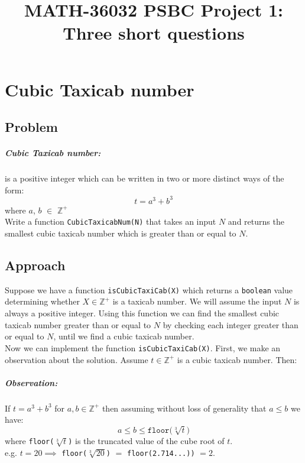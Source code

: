 \documentclass[11pt]{report}
\title{MATH-36032 PSBC Project 1: Three short questions}
\begin{document}
\chapter{Cubic Taxicab number}

\section*{Problem}
\paragraph{Cubic Taxicab number:}
is a positive integer which can be written in two or more distinct ways of the form:
\begin{equation*}
	t = a^3 + b^3
\end{equation*} where $a$, $b$ $\in$ $\mathbb{Z^+}$ \\

Write a function \texttt{CubicTaxicabNum(N)} that takes an input $N$ and returns the smallest cubic taxicab number which is greater than or equal to $N$.

\section{Approach}
Suppose we have a function \texttt{isCubicTaxiCab(X)} which returns a \texttt{boolean} value determining whether $X \in \mathbb{Z^+}$ is a taxicab number. We will assume the input $N$ is always a positive integer. Using this function we can find the smallest cubic taxicab number greater than or equal to $N$ by checking each integer greater than or equal to $N$, until we find a cubic taxicab number. \\



Now we can implement the function \texttt{isCubicTaxiCab(X)}. First, we make an observation about the solution. Assume $t \in \mathbb{Z^+}$ is a cubic taxicab number. Then:

\paragraph{Observation:}
If $t=a^3+b^3$ for $a, b \in \mathbb{Z^+}$ then assuming without loss of generality that $a \leqslant b$ we have:
\begin{equation*}
	a \leqslant b \leqslant \texttt{floor(}\sqrt[3]{t}\texttt{)} 
\end{equation*} where \texttt{floor($\sqrt[3]{t}$)} is the truncated value of the cube root of $t$. \\ 
e.g. $t=20 \implies$ \texttt{floor($\sqrt[3]{20}$)} $=$ \texttt{floor(2.714...))} $=2$. \\
\end{document}

